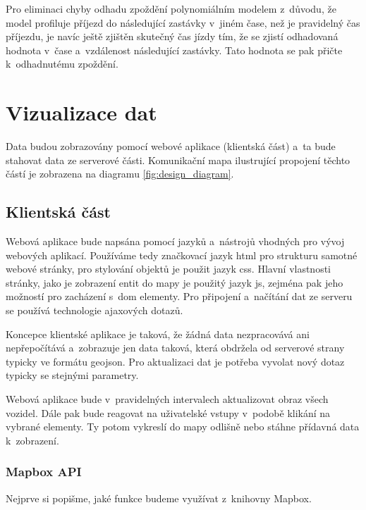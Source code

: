 \bigbreak


Pro eliminaci chyby odhadu zpoždění polynomiálním modelem z~důvodu, že model profiluje příjezd do následující zastávky v~jiném čase, než je pravidelný čas příjezdu, je navíc ještě zjištěn skutečný čas jízdy tím, že se zjistí odhadovaná hodnota v~čase a~vzdálenost následující zastávky. Tato hodnota se pak přičte k~odhadnutému zpoždění.


\section{Vizualizace dat}


Data budou zobrazovány pomocí webové aplikace (klientská část) a~ta bude stahovat data ze serverové části. Komunikační mapa ilustrující propojení těchto částí je zobrazena na diagramu \ref{fig:design_diagram}.


\subsection{Klientská část}


Webová aplikace bude napsána pomocí jazyků a~nástrojů vhodných pro vývoj webových aplikací. Používáme tedy značkovací jazyk \gls{html} pro strukturu samotné webové stránky, pro stylování objektů je použit jazyk \gls{css}. Hlavní vlastnosti stránky, jako je zobrazení entit do mapy je použitý jazyk \gls{js}, zejména pak jeho možností pro zacházení s~\gls{dom} elementy. Pro připojení a~načítání dat ze serveru se používá technologie \gls{ajax}ových dotazů.


\bigbreak


Koncepce klientské aplikace je taková, že žádná data nezpracovává ani nepřepočítává a~zobrazuje jen data taková, která obdržela od serverové strany typicky ve formátu \gls{geojson}. Pro aktualizaci dat je potřeba vyvolat nový dotaz typicky se stejnými parametry.


\bigbreak


Webová aplikace bude v~pravidelných intervalech aktualizovat obraz všech vozidel. Dále pak bude reagovat na uživatelské vstupy v~podobě klikání na vybrané elementy. Ty potom vykreslí do mapy odlišně nebo stáhne přídavná data k~zobrazení.


\subsubsection{Mapbox API}


Nejprve si popišme, jaké funkce budeme využívat z~knihovny Mapbox.


